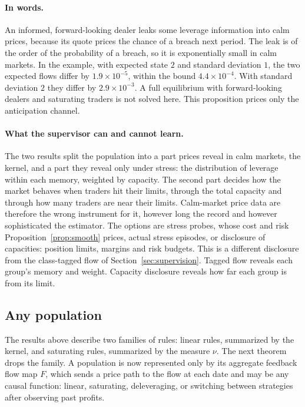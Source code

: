\paragraph{In words.} An informed, forward-looking dealer leaks some leverage information into calm prices, because its quote prices the chance of a breach next period. The leak is of the order of the probability of a breach, so it is exponentially small in calm markets. In the example, with expected state $2$ and standard deviation $1$, the two expected flows differ by $1.9\times10^{-5}$, within the bound $4.4\times10^{-4}$. With standard deviation $2$ they differ by $2.9\times10^{-3}$. A full equilibrium with forward-looking dealers and saturating traders is not solved here. This proposition prices only the anticipation channel.

\paragraph{What the supervisor can and cannot learn.} The two results split the population into a part prices reveal in calm markets, the kernel, and a part they reveal only under stress: the distribution of leverage within each memory, weighted by capacity. The second part decides how the market behaves when traders hit their limits, through the total capacity and through how many traders are near their limits. Calm-market price data are therefore the wrong instrument for it, however long the record and however sophisticated the estimator. The options are stress probes, whose cost and risk Proposition~\ref{prop:smooth} prices, actual stress episodes, or disclosure of capacities: position limits, margins and risk budgets. This is a different disclosure from the class-tagged flow of Section~\ref{sec:supervision}. Tagged flow reveals each group's memory and weight. Capacity disclosure reveals how far each group is from its limit.

\subsection{Any population}\label{sec:anypop}

The results above describe two families of rules: linear rules, summarized by the kernel, and saturating rules, summarized by the measure $\nu$. The next theorem drops the family. A population is now represented only by its aggregate feedback flow map $F$, which sends a price path to the flow at each date and may be any causal function: linear, saturating, deleveraging, or switching between strategies after observing past profits.

